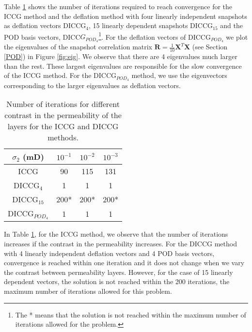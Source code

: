 \documentclass[12pt]{article}
\numberwithin{equation}{section}
\begin{document}
Table \ref{table:he22} shows the number of iterations required to reach convergence for the ICCG method and the deflation method with four linearly independent snapshots as deflation vectors DICCG$_{4}$, 15 linearly dependent snapshots DICCG$_{15}$ and the POD basis vectors, DICC$G_{POD_4}$\footnote{The * means that the solution is not reached within the maximum number of iterations allowed for the problem.}.
For the deflation vectors of DICCG$_{POD_4}$ we plot the eigenvalues of the snapshot correlation matrix $\mathbf{R}=\frac{1}{10}\mathbf{X}^T \mathbf{X}$ (see Section \ref{POD}) in Figure \ref{fig:eig}. We observe that there are 4 eigenvalues much larger than the rest. These largest eigenvalues are responsible for the slow convergence of the ICCG method. For the  DICCG$_{POD_4}$ method, we use the eigenvectors corresponding to the larger eigenvalues as deflation vectors.\\
\renewcommand{\arraystretch}{1.3}
\begin{table}[!ht]\centering
\begin{minipage}{.7\textwidth}
\vspace{10pt}
\centering
\begin{tabular}{ |c|c|c|c|} 
\hline
 $\sigma_2$ (mD) & $10^{-1}$& $10^{-2}$ & $10^{-3}$ \\
 \hline
  ICCG  & 90& 115&131\\ 
 
  DICCG$_4$  & 1 & 1& 1\\ 
  DICCG$_{15}$  & 200* & 200*& 200*\\
  DICCG$_{POD_4}$  & 1 & 1& 1\\
 \hline
\end{tabular}
\caption{Number of iterations for different contrast in the permeability of the layers
for the ICCG and DICCG methods.}
\label{table:he22}\end{minipage}
\end{table}

In Table \ref{table:he22}, for the ICCG method, we observe that the number of iterations 
increases if the contrast in the permeability increases. For the DICCG method with 4 linearly independent deflation vectors and 4 POD basis vectors, convergence is reached 
within one iteration and it does not change when we vary the contrast between permeability layers. However, for the case of 15 linearly dependent vectors, the solution is not reached within the 200 iterations, the maximum number of iterations allowed for this problem.\\
\end{document}
